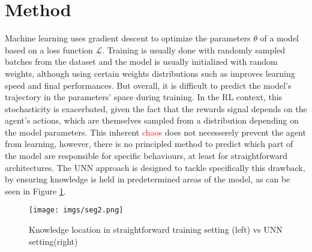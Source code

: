 \documentclass[letterpaper, 10 pt, conference]{ieeeconf}  %
\begin{document}
\section{Method} %
\label{sec:method}


Machine learning uses gradient descent to optimize the parameters $\theta$ of a model based on a loss function $\mathcal{L}$. Training is usually done with randomly sampled batches from the dataset and the model is usually initialized with random weights, although using certain weights distributions such as \textcolor{green}{\cite{XavierInit}} improves learning speed and final performances. But overall, it is difficult to predict the model's trajectory in the parameters' space during training. In the RL context, this stochasticity is exacerbated, given the fact that the rewards signal depends on the agent's actions, which are themselves sampled from a distribution depending on the model parameters. This inherent \textcolor{red}{chaos} does not necesserely prevent the agent from learning, however, there is no principled method to predict which part of the model are responsible for specific behaviours, at least for straightforward architectures. The UNN approach is designed to tackle specifically this drawback, by ensuring knowledge is held in predetermined areas of the model, as can be seen in Figure \ref{segment_model}. 




\begin{figure}
\centering
\texttt{[image: imgs/seg2.png]}
\caption{Knowledge location in straightforward training setting (left) vs UNN setting(right)}
\label{segment_model}
\end{figure}
\end{document}
